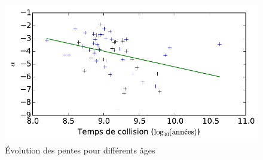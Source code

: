 
				\begin{figure}[h!]
					\centering \includegraphics[scale=1.0]{graphe/pente_tc.pdf}
					\caption{Évolution des pentes pour différents âges}
					\label{Pente-lin_dim}
				\end{figure}

